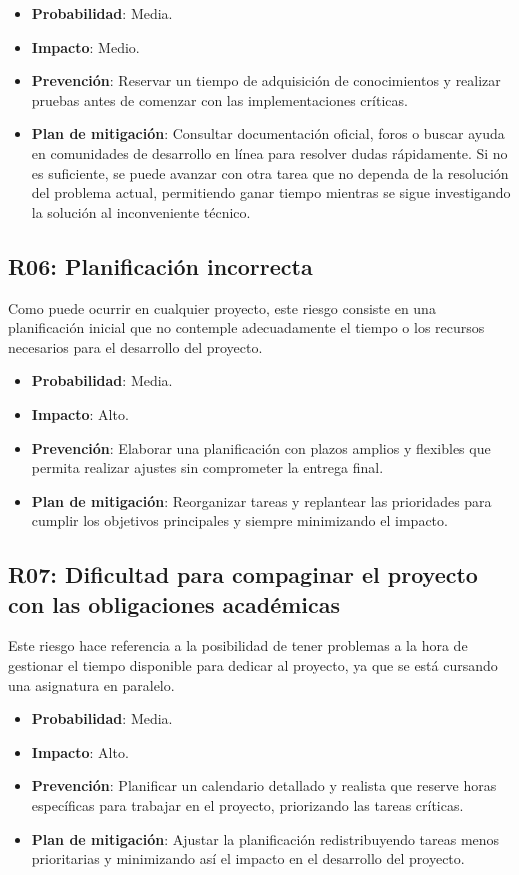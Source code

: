 \begin{itemize}
    \item \textbf{Probabilidad}: Media.
    \item \textbf{Impacto}: Medio.
    \item \textbf{Prevención}: Reservar un tiempo de adquisición de conocimientos y realizar pruebas antes de comenzar con las implementaciones críticas.
    \item \textbf{Plan de mitigación}: Consultar documentación oficial, foros o buscar ayuda en comunidades de desarrollo en línea para resolver dudas rápidamente. Si no es suficiente, se puede avanzar con otra tarea que no dependa de la resolución del problema actual, permitiendo ganar tiempo mientras se sigue investigando la solución al inconveniente técnico.
\end{itemize}

\subsection{R06: Planificación incorrecta}
Como puede ocurrir en cualquier proyecto, este riesgo consiste en una planificación inicial que no contemple adecuadamente el tiempo o los recursos necesarios para el desarrollo del proyecto.

\begin{itemize}
    \item \textbf{Probabilidad}: Media.
    \item \textbf{Impacto}: Alto.
    \item \textbf{Prevención}: Elaborar una planificación con plazos amplios y flexibles que permita realizar ajustes sin comprometer la entrega final.
    \item \textbf{Plan de mitigación}: Reorganizar tareas y replantear las prioridades para cumplir los objetivos principales y siempre minimizando el impacto.
\end{itemize}

\subsection{R07: Dificultad para compaginar el proyecto con las obligaciones académicas}
Este riesgo hace referencia a la posibilidad de tener problemas a la hora de gestionar el tiempo disponible para dedicar al proyecto, ya que se está cursando una asignatura en paralelo.

\begin{itemize}
    \item \textbf{Probabilidad}: Media.
    \item \textbf{Impacto}: Alto.
    \item \textbf{Prevención}: Planificar un calendario detallado y realista que reserve horas específicas para trabajar en el proyecto, priorizando las tareas críticas.
    \item \textbf{Plan de mitigación}: Ajustar la planificación redistribuyendo tareas menos prioritarias y minimizando así el impacto en el desarrollo del proyecto.
\end{itemize}

